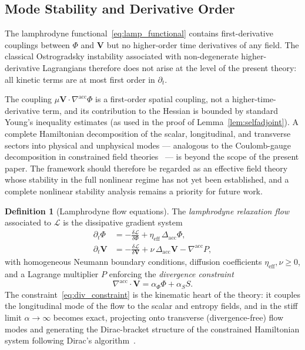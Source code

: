 \documentclass[12pt,a4paper]{article}
\theoremstyle{plain}
\theoremstyle{definition}
\newtheorem{definition}[theorem]{Definition}
\theoremstyle{remark}
\newcommand{\Lacc}{\mathcal{L}}
\newcommand{\nabacc}{\nabla^{\!\mathrm{acc}}}
\newcommand{\Delacc}{\Delta_{\mathrm{acc}}}
\newcommand{\etaeff}{\eta_{\mathrm{eff}}}
\begin{document}
\subsection{Mode Stability and Derivative Order}
\label{subsec:ghosts}

The lamphrodyne functional~\eqref{eq:lamp_functional} contains first-derivative
couplings between $\Phi$ and $\mathbf{V}$ but no higher-order time derivatives
of any field. The classical Ostrogradsky instability associated with
non-degenerate higher-derivative Lagrangians therefore does not arise at the
level of the present theory: all kinetic terms are at most first order in $\partial_t$.

The coupling $\mu\mathbf{V}\cdot\nabacc\Phi$ is a first-order spatial coupling,
not a higher-time-derivative term, and its contribution to the Hessian is bounded
by standard Young's inequality estimates (as used in the proof of Lemma~\ref{lem:selfadjoint}).
A complete Hamiltonian decomposition of the scalar, longitudinal, and transverse
sectors into physical and unphysical modes --- analogous to the Coulomb-gauge
decomposition in constrained field theories~\cite{Arnold1989} --- is beyond the
scope of the present paper. The framework should therefore be regarded as an
effective field theory whose stability in the full nonlinear regime has not yet
been established, and a complete nonlinear stability analysis remains a priority
for future work.

\begin{definition}[Lamphrodyne flow equations]
\label{def:lamp_flow}
The \emph{lamphrodyne relaxation flow} associated to $\Lacc$ is the
dissipative gradient system
\begin{align}
  \partial_t\Phi
  &= -\frac{\delta\Lacc}{\delta\Phi} + \etaeff\,\Delacc\Phi,
  \label{eq:lamp_phi} \\[4pt]
  \partial_t\mathbf{V}
  &= -\frac{\delta\Lacc}{\delta\mathbf{V}}
     + \nu\,\Delacc\mathbf{V}
     - \nabacc P,
  \label{eq:lamp_V}
\end{align}
with homogeneous Neumann boundary conditions, diffusion coefficients $\etaeff,\nu\geq 0$,
and a Lagrange multiplier $P$ enforcing the \emph{divergence constraint}
\begin{equation}
  \nabacc\cdot\mathbf{V} = \alpha_\Phi\Phi + \alpha_S S.
  \label{eq:div_constraint}
\end{equation}
The constraint~\eqref{eq:div_constraint} is the kinematic heart of the theory:
it couples the longitudinal mode of the flow to the scalar and entropy fields,
and in the stiff limit $\alpha\to\infty$ becomes exact, projecting onto
transverse (divergence-free) flow modes and generating the Dirac-bracket
structure of the constrained Hamiltonian system following Dirac's
algorithm~\cite{Arnold1989,Hirsch1974}.
\end{definition}
\end{document}
